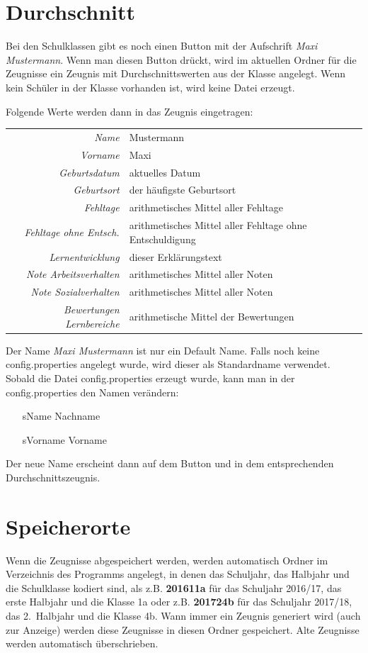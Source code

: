 \documentclass[a4paper,notitlepage,parskip]{scrartcl}
\newcommand\ott{\normalfont\ttfamily}
\begin{document}
\section{Durchschnitt}
Bei den Schulklassen gibt es noch einen Button mit der Aufschrift \emph{Maxi Mustermann}.
Wenn man diesen Button drückt, wird im aktuellen Ordner für die Zeugnisse ein Zeugnis mit Durchschnittswerten aus der Klasse angelegt. Wenn kein Schüler in der Klasse vorhanden ist, wird keine Datei erzeugt.

Folgende Werte werden dann in das Zeugnis eingetragen:

\begin{center}
\begin{tabular}{rl}
\hline
\emph{Name}                    	& Mustermann\\
\emph{Vorname} 					& Maxi\\
\emph{Geburtsdatum} 			& aktuelles Datum\\
\emph{Geburtsort} 				& der häufigste Geburtsort\\
\emph{Fehltage} 				& arithmetisches Mittel aller Fehltage\\
\emph{Fehltage ohne Entsch.} 	& arithmetisches Mittel aller Fehltage ohne Entschuldigung\\
\emph{Lernentwicklung} 			& dieser Erklärungstext\\
\emph{Note Arbeitsverhalten} 	& arithmetisches Mittel aller Noten\\
\emph{Note Sozialverhalten} 	& arithmetisches Mittel aller Noten\\
\emph{Bewertungen Lernbereiche} & arithmetische Mittel der Bewertungen\\
\hline
\end{tabular}
\end{center}


Der Name \emph{Maxi Mustermann} ist nur ein Default Name. Falls noch keine {\ott config.properties} angelegt wurde, wird dieser als Standardname verwendet. Sobald die Datei {\ott config.properties} 
erzeugt wurde, kann man in der {\ott config.properties} den Namen verändern:

\begin{itemize}
\setlength{\itemindent}{3.5cm}
\item[sName] Nachname
\item[sVorname] Vorname
\end{itemize}

Der neue Name erscheint dann auf dem Button und in dem entsprechenden Durchschnittszeugnis.
\section{Speicherorte}
Wenn die Zeugnisse abgespeichert werden, werden automatisch Ordner im Verzeichnis des Programms angelegt, in denen das Schuljahr, das Halbjahr und die Schulklasse kodiert sind, als z.B.
{\ott\normalfont\bfseries 201611a} für das Schuljahr 2016/17, das erste Halbjahr und die Klasse 1a oder z.B. {\ott\normalfont\bfseries 201724b}
für das Schuljahr 2017/18, das 2.~Halbjahr und die Klasse 4b.
Wann immer ein Zeugnis generiert wird (auch zur Anzeige) werden diese Zeugnisse in diesen Ordner gespeichert. Alte Zeugnisse werden automatisch überschrieben.
\end{document}
